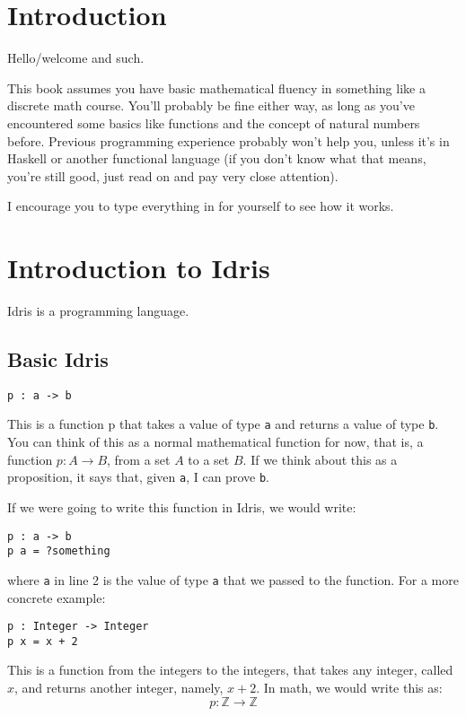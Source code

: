 \documentclass{article}
\newcommand{\inline}[1]{\texttt{#1}}
\begin{document}
\section{Introduction}
Hello/welcome and such.

This book assumes you have basic mathematical fluency in something like a discrete math course.
You'll probably be fine either way, as long as you've encountered some basics like functions and the concept of natural numbers before.
Previous programming experience probably won't help you, unless it's in Haskell or another functional language (if you don't know what that means, you're still good, just read on and pay very close attention).

I encourage you to type everything in for yourself to see how it works.

\section{Introduction to Idris}

Idris is a programming language.

\subsection{Basic Idris}
\begin{verbatim}
p : a -> b
\end{verbatim}

This is a function p that takes a value of type \inline{a} and returns a value of type \inline{b}.
You can think of this as a normal mathematical function for now, that is, a function $p : A \rightarrow B$, from a set $A$ to a set $B$.
If we think about this as a proposition, it says that, given \inline{a}, I can prove \inline{b}.

If we were going to write this function in Idris, we would write:

\begin{verbatim}
p : a -> b
p a = ?something
\end{verbatim}

where \inline{a} in line 2 is the value of type \inline{a} that we passed to the function. For a more concrete example:

\begin{verbatim}
p : Integer -> Integer
p x = x + 2
\end{verbatim}

This is a function from the integers to the integers, that takes any integer, called $x$, and returns another integer, namely, $x + 2$.
In math, we would write this as:
\[
    p : \mathbb{Z} \rightarrow \mathbb{Z}
\]
\end{document}
